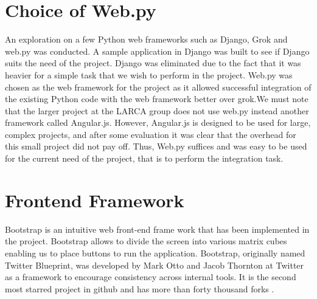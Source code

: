 \section{Choice of Web.py}
An exploration on a few Python web frameworks such as Django, Grok and web.py was conducted. A sample application in Django was built to see if Django suits the need of the project. Django was eliminated due to the fact that it was heavier for a simple task that we wish to perform in the project. Web.py was chosen as the web framework for the project as it allowed successful integration  of the existing Python code with the web framework better over grok.We must note that the larger project at the LARCA group does not use web.py instead another framework called Angular.js. However, Angular.js is designed to be used for large, complex projects, and after some evaluation it was clear that the overhead for this small project did not pay off. 
Thus, Web.py suffices and was easy to be used for the current need of the project, that is to perform the integration task.  

\section{Frontend Framework}
Bootstrap is an intuitive web front-end frame work that has been implemented in the project.  Bootstrap allows to divide the screen into various matrix cubes enabling us to place buttons to run the application. Bootstrap, originally named Twitter Blueprint, was developed by Mark Otto and Jacob Thornton at Twitter as a framework to encourage consistency across internal tools. It is the second most starred project in github and has more than forty thousand forks \cite{bootstrap}.


